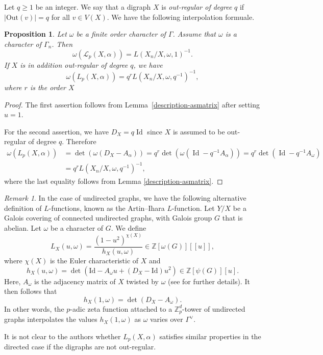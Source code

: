 \documentclass[11pt]{amsart}
\DeclareMathOperator{\Id}{Id}
\newtheorem{proposition}[theorem]{Proposition}
\numberwithin{equation}{section}
\theoremstyle{remark}
\newtheorem{remark}[theorem]{Remark}
\newcommand{\?}{\stackrel{?}{=}}
\newcommand{\ZZ}{\mathbb{Z}}
\newcommand{\Zp}{\mathbb{Z}_p}
\newcommand{\Out}{\mathrm{Out}}
\begin{document}
Let $q\ge1$ be an integer. We say that a digraph $X$ is \textit{out-regular of degree} $q$ if $|\Out(v)|=q$ for all $v\in V(X)$. We have the following interpolation formuale.
\begin{proposition}
\label{interpolation}
    Let $\omega$ be a finite order character of $\Gamma$. Assume that $\omega$ is a character of $\Gamma_n$. Then 
    \[\omega(\mathcal{L}_p(X,\alpha))=L(X_n/X,\omega,1)^{-1}.\]
    If $X$ is in addition out-regular of degree $q$, we have
    \[\omega(L_p(X,\alpha))=q^{r}L(X_n/X,\omega,q^{-1})^{-1},\]
    where $r$ is the order $X$
\end{proposition}
\begin{proof}
The first assertion follows from Lemma~\ref{description-asmatrix} after setting $u=1$.
    
    For the second assertion, we have $D_X=q\Id$ since $X$ is assumed to be out-regular of degree $q$. Therefore
    \begin{align*}\omega(L_p(X,\alpha))&=\det(\omega(D_X-A_\alpha))=q^{r}\det(\omega(\Id-q^{-1}A_\alpha))=q^r\det(\Id-q^{-1}A_\omega)\\&=q^rL(X_n/X,\omega,q^{-1})^{-1},\end{align*}
    where the last equality follows from Lemma \ref{description-asmatrix}.
\end{proof}
\begin{remark}
In the case of undirected graphs, we have the following alternative definition of $L$-functions, known as the Artin--Ihara $L$-function. Let $Y/X$ be a Galois covering of connected undirected graphs, with Galois group $G$ that is abelian. Let $\omega$ be a character of $G$. We define
\[
L_X(u,\omega)=\frac{(1-u^2)^{\chi(X)}}{h_X(u,\omega)}\in\ZZ[\omega(G)][[u]],
\]
    where $\chi(X)$ is the Euler characteristic of $X$ and
    \[
    h_X(u,\omega)=\det(\mathrm{Id}-A_\omega u+(D_X-\mathrm{Id})u^2)\in\ZZ[\psi(G)][u].
    \]
    Here, $A_\omega$ is the adjacency matrix of $X$ twisted by $\omega$ (see \cite[\S2.4]{DV} for further details). It then follows that
    \[
    h_X(1,\omega)=\det(D_X-A_\omega).
    \]
   In other words, the $p$-adic zeta function attached to a $\Zp^d$-tower of undirected graphs interpolates the values $h_X(1,\omega)$ as $\omega$ varies over $\Gamma^\vee$.
   
It is not clear to the authors whether $L_p(X,\alpha)$ satisfies similar properties in the directed case if the digraphs are not out-regular. 
\end{remark}
\end{document}
